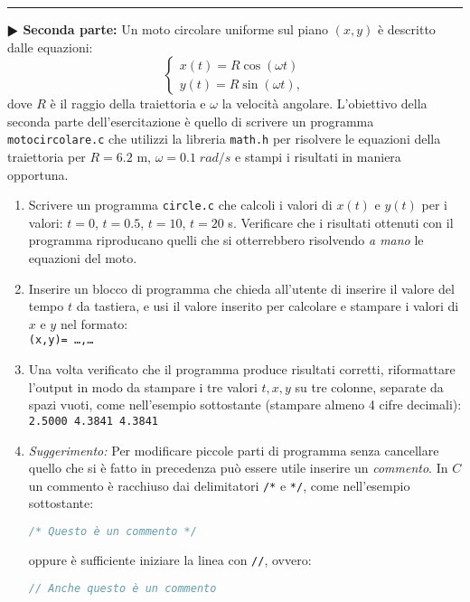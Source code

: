 \documentclass[11pt]{article}
\begin{document}
\hrule
\vspace{1mm}
\textbf{$\RHD$ Seconda parte:} 
Un moto circolare uniforme sul piano $(x,y)$ \`e descritto dalle equazioni:
\[
\left\{ \begin{array}{ll} 
x(t) = R \cos \left(\omega t \right)
\\ 
y(t) = R \sin \left(\omega t \right),
\end{array}
\right.
\]
dove $R$ \`e il raggio della traiettoria e $\omega$ la velocit\`a angolare.
L'obiettivo della seconda parte dell'esercitazione \`e quello di scrivere un programma \texttt{motocircolare.c} che utilizzi la libreria \texttt{math.h}
per risolvere le equazioni della traiettoria per $R=6.2$ m, $\omega=0.1 \; rad/s$ e stampi i risultati in maniera opportuna.

\begin{enumerate}
\item Scrivere un programma \texttt{circle.c} che calcoli i valori di $x(t)$ e $y(t)$ per i valori: $t=0$, $t=0.5$, $t=10$, $t=20$ s.
Verificare che i risultati ottenuti con il programma riproducano quelli che si otterrebbero risolvendo {\em a mano\/} le equazioni del moto.

\item Inserire un blocco di programma che chieda all'utente di inserire il valore del tempo $t$ da tastiera, e usi il valore inserito per calcolare e stampare i valori di $x$ e $y$ nel formato:
  \\
  \texttt{(x,y)= \ldots,\ldots}
  
\item Una volta verificato che il programma produce risultati corretti, riformattare
  l'output in modo da stampare i tre valori $t,x,y$ su tre colonne, separate da spazi vuoti, come nell'esempio sottostante (stampare almeno 4 cifre decimali):
  \\
  \texttt{2.5000    4.3841    4.3841}%
\item {\em Suggerimento:\/} Per modificare piccole parti di programma senza cancellare quello che
  si \`e fatto in precedenza pu\`o essere utile inserire un {\em commento}.
  In $C$ un commento \`e racchiuso dai delimitatori \texttt{/*} e  \texttt{*/}, come nell'esempio
  sottostante:
\begin{lstlisting}[language=c,numbers=none]
  /* Questo è un commento */
\end{lstlisting}%
oppure è sufficiente iniziare la linea con \texttt{//}, ovvero:
\begin{lstlisting}[language=c,numbers=none]
  // Anche questo è un commento
\end{lstlisting}
\end{enumerate}
\end{document}
